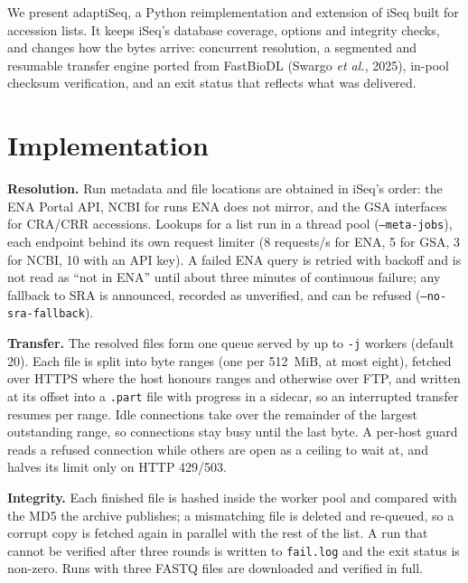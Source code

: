 \documentclass[9pt,twocolumn,a4paper]{extarticle}
\newcommand{\code}[1]{{\small\texttt{#1}}}
\begin{document}
We present adaptiSeq, a Python reimplementation and extension of iSeq built for accession lists. It keeps iSeq's database coverage, options and integrity checks, and changes how the bytes arrive: concurrent resolution, a segmented and resumable transfer engine ported from FastBioDL (Swargo {\it et al.}, 2025), in-pool checksum verification, and an exit status that reflects what was delivered.

\section{Implementation}
\textbf{Resolution.} Run metadata and file locations are obtained in iSeq's order: the ENA Portal API, NCBI for runs ENA does not mirror, and the GSA interfaces for CRA/CRR accessions. Lookups for a list run in a thread pool (\code{--meta-jobs}), each endpoint behind its own request limiter (8 requests/s for ENA, 5 for GSA, 3 for NCBI, 10 with an API key). A failed ENA query is retried with backoff and is not read as ``not in ENA'' until about three minutes of continuous failure; any fallback to SRA is announced, recorded as unverified, and can be refused (\code{--no-sra-fallback}).

\textbf{Transfer.} The resolved files form one queue served by up to \code{-j} workers (default 20). Each file is split into byte ranges (one per 512~MiB, at most eight), fetched over HTTPS where the host honours ranges and otherwise over FTP, and written at its offset into a \code{.part} file with progress in a sidecar, so an interrupted transfer resumes per range. Idle connections take over the remainder of the largest outstanding range, so connections stay busy until the last byte. A per-host guard reads a refused connection while others are open as a ceiling to wait at, and halves its limit only on HTTP 429/503.

\textbf{Integrity.} Each finished file is hashed inside the worker pool and compared with the MD5 the archive publishes; a mismatching file is deleted and re-queued, so a corrupt copy is fetched again in parallel with the rest of the list. A run that cannot be verified after three rounds is written to \code{fail.log} and the exit status is non-zero. Runs with three FASTQ files are downloaded and verified in full.
\end{document}
